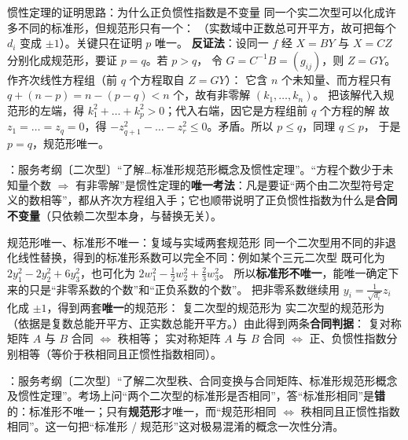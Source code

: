 \begin{fdeep}{惯性定理的证明思路：为什么正负惯性指数是不变量}
同一个实二次型可以化成许多不同的标准形，但规范形只有一个：
（实数域中正数总可开平方，故可把每个 $d_i$ 变成 $\pm1$）。关键只在证明 $p$ 唯一。
\textbf{反证法}：设同一 $f$ 经 $X=BY$ 与 $X=CZ$ 分别化成规范形，要证 $p=q$。若 $p>q$，
令 $G=C^{-1}B=(g_{ij})$，则 $Z=GY$。作齐次线性方程组（前 $q$ 个方程取自 $Z=GY$）：
它含 $n$ 个未知量、而方程只有 $q+(n-p)=n-(p-q)<n$ 个，故有非零解 $(k_1,\dots,k_n)$。
把该解代入规范形的左端，得 $k_1^{2}+\dots+k_p^{2}>0$；代入右端，因它是方程组前 $q$ 个方程的解
故 $z_1=\dots=z_q=0$，得 $-z_{q+1}^{2}-\dots-z_r^{2}\le0$。矛盾。所以 $p\le q$，同理 $q\le p$，
于是 $p=q$，规范形唯一。

\fbref{}：服务考纲〔二次型〕“了解…标准形规范形概念及惯性定理”。“方程个数少于未知量个数 $\Longrightarrow$ 有非零解”是惯性定理的\textbf{唯一考法}：凡是要证“两个由二次型符号定义的数相等”，都从齐次方程组入手；它也顺带说明了正负惯性指数为什么是\textbf{合同不变量}（只依赖二次型本身，与替换无关）。
\end{fdeep}

\begin{fdeep}{规范形唯一、标准形不唯一：复域与实域两套规范形}
同一个二次型用不同的非退化线性替换，得到的标准形系数可以完全不同：例如某个三元二次型
既可化为 $2y_1^{2}-2y_2^{2}+6y_3^{2}$，也可化为 $2w_1^{2}-\frac{1}{2}w_2^{2}+\frac{2}{3}w_3^{2}$。
所以\textbf{标准形不唯一}，能唯一确定下来的只是“非零系数的个数”和“正负系数的个数”。
把非零系数继续用 $y_i=\frac{1}{\sqrt{d_i}}z_i$ 化成 $\pm1$，得到两套\textbf{唯一}的规范形：
复二次型的规范形为
实二次型的规范形为
（依据是复数总能开平方、正实数总能开平方。）由此得到两条\textbf{合同判据}：
复对称矩阵 $A$ 与 $B$ 合同 $\iff$ 秩相等；
实对称矩阵 $A$ 与 $B$ 合同 $\iff$ 正、负惯性指数分别相等（等价于秩相同且正惯性指数相同）。

\fbref{}：服务考纲〔二次型〕“了解二次型秩、合同变换与合同矩阵、标准形规范形概念及惯性定理”。考场上问“两个二次型的标准形是否相同”，答“标准形相同”是\textbf{错}的：标准形不唯一；只有\textbf{规范形}才唯一，而“规范形相同 $\iff$ 秩相同且正惯性指数相同”。这一句把“标准形 / 规范形”这对极易混淆的概念一次性分清。
\end{fdeep}


